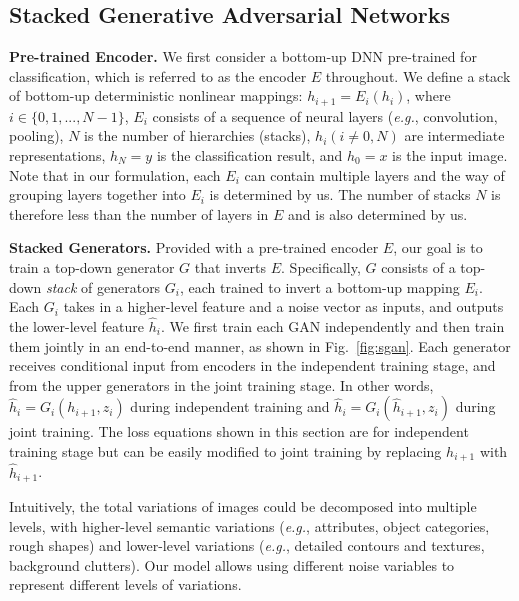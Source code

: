 \documentclass[10pt,twocolumn,letterpaper]{article}
\newcommand{\vpara}[1]{\vspace{0.1in}\noindent\textbf{#1}}
\begin{document}
\subsection{Stacked Generative Adversarial Networks}
\label{SGAN}

\vpara{Pre-trained Encoder.} We first consider a bottom-up DNN pre-trained for classification, 
which is referred to as the encoder $E$ throughout. %
We define a stack of bottom-up deterministic nonlinear mappings: $h_{i+1} = E_{i}(h_{i})$, where $i \in \{0,1,...,N-1\}$, $E_{i}$ consists of a sequence of neural layers (\emph{e.g.}, convolution, pooling), %
$N$ is the number of hierarchies (stacks), $h_{i} (i \neq 0, N)$ are intermediate representations,  $h_{N}=y$ is the classification result,  and $h_{0}=x$ is the input image.  Note that in our formulation, each $E_{i}$ can contain multiple layers and the way of grouping layers together into $E_{i}$ is determined by us. The number of stacks $N$ is therefore less than the number of layers in $E$ and is also determined by us.

\vpara{Stacked Generators.}  Provided with a pre-trained encoder $E$, our goal is to train a top-down generator $G$ that inverts $E$. Specifically, $G$ consists of a top-down \emph{stack} of generators $G_{i}$, each trained to invert a bottom-up mapping $E_{i}$. Each $G_{i}$ takes in a higher-level feature and a noise vector as inputs, and  outputs the lower-level feature $\hat{h}_{i}$. 
We first train each GAN independently and then train them jointly in an end-to-end manner, as shown in Fig.~\ref{fig:sgan}. 
Each generator receives conditional input from encoders in the independent training stage, and from the upper generators in the joint training stage.  In other words, $\hat{h}_{i} = G_{i}(h_{i+1}, z_{i})$ during independent training and $\hat{h}_{i} = G_{i}(\hat{h}_{i+1}, z_{i})$ during joint training. The loss equations shown in this section are for independent training stage but can be easily modified to joint training by replacing $h_{i+1}$ with $\hat{h}_{i+1}$. 

Intuitively, the total variations of images could be decomposed into multiple levels, with higher-level semantic variations (\emph{e.g.}, attributes, object categories, rough shapes) and lower-level variations (\emph{e.g.}, detailed contours and textures, background clutters). Our model allows using different noise variables to represent different levels of variations.
\end{document}
